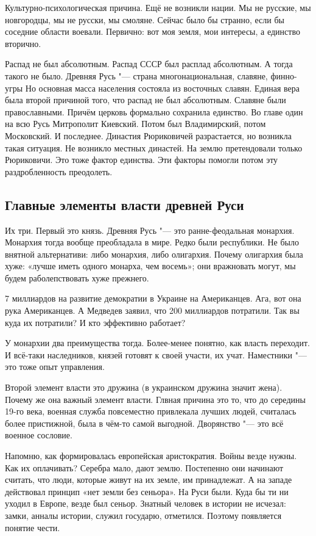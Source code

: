 Культурно-психологическая причина. Ещё не возникли нации. Мы не русские, мы новгородцы, мы не русски, мы смоляне. Сейчас было бы странно, если бы соседние области воевали. Первично: вот моя земля, мои интересы, а единство вторично.

Распад не был абсолютным. Распад СССР был расплад абсолютным. А тогда такого не было. Древняя Русь "--- страна многонациональная, славяне, финно-угры\ldotst{ } Но основная масса населения состояла из восточных славян. Единая вера была второй причиной того, что распад не был абсолютным. Славяне были православными. Причём церковь формально сохранила единство. Во главе один на всю Русь Митрополит Киевский. Потом был Владимирский, потом Московский.
И последнее. Династия Рюриковичей разрастается, но возникла такая ситуация. Не возникло местных династей. На землю претендовали только Рюриковичи. Это тоже фактор единства. Эти факторы помогли потом эту раздробленность преодолеть.

\subsection{Главные элементы власти древней Руси}
Их три. Первый это князь. Древняя Русь "--- это ранне-феодальная монархия. Монархия тогда вообще преобладала в мире. Редко были республики. Не было внятной альтернативи: либо монархия, либо олигархия. Почему олигархия была хуже: «лучше иметь одного монарха, чем восемь»; они вражновать могут, мы будем раболепствовать хуже прежнего.

7 миллиардов на развитие демократии в Украине на Американцев. Ага, вот она рука Американцев. А Медведев заявил, что 200 миллиардов потратили. Так вы куда их потратили? И кто эффективно работает?

У монархии два преимущества тогда. Более-менее понятно, как власть переходит. И всё-таки наследников, князей готовят к своей участи, их учат. Наместники "--- это тоже опыт управления.

Второй элемент власти это дружина (в украинском дружина значит жена). Почему же она важный элемент власти. Глвная причина это то, что до середины 19-го века, военная служба повсеместно привлекала лучших людей, считалась более пристижной, была в чём-то самой выгодной. Дворянство "--- это всё военное сословие.

Напомню, как формировалась европейская аристократия. Войны везде нужны. Как их оплачивать? Серебра мало, дают землю. Постепенно они начинают считать, что люди, которые живут на их земле, им принадлежат. А на западе действовал принцип «нет земли без сеньора». На Руси были. Куда бы ти ни уходил в Европе, везде был сеньор. Знатный человек в истории не исчезал: замки, анналы истории, служил государю, отметился. Поэтому появляется понятие чести.

